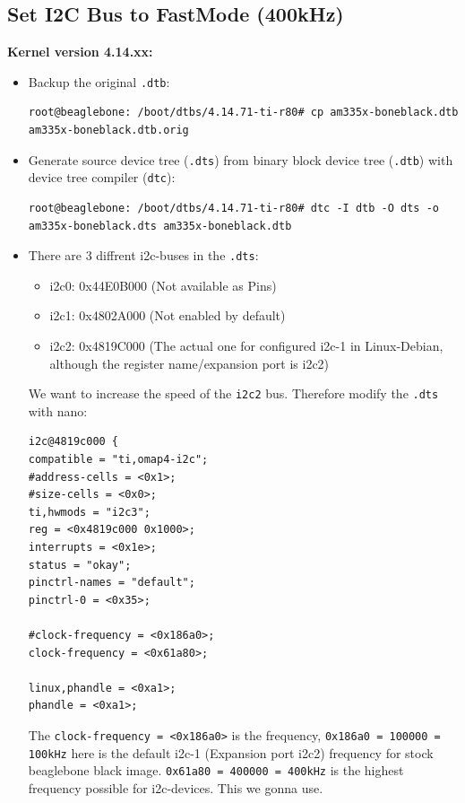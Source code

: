 \documentclass[
	fontsize=10pt
	paper=a4
]{scrartcl}
\begin{document}
\subsection{Set I2C Bus to FastMode (400kHz)}

\textbf{Kernel version 4.14.xx:}
\begin{itemize}
\item Backup the original \texttt{.dtb}:
\begin{lstlisting}
root@beaglebone: /boot/dtbs/4.14.71-ti-r80# cp am335x-boneblack.dtb am335x-boneblack.dtb.orig
\end{lstlisting}

\item Generate source device tree (\texttt{.dts}) from  binary block device tree (\texttt{.dtb}) with device tree compiler (\texttt{dtc}):
\begin{lstlisting}
root@beaglebone: /boot/dtbs/4.14.71-ti-r80# dtc -I dtb -O dts -o am335x-boneblack.dts am335x-boneblack.dtb
\end{lstlisting}

\item There are 3 diffrent i2c-buses in the \texttt{.dts}:
\begin{itemize}
	\item i2c0: 0x44E0B000 (Not available as Pins)
	\item i2c1: 0x4802A000 (Not enabled by default)
	\item i2c2: 0x4819C000 (The actual one for configured i2c-1 in Linux-Debian, although the register name/expansion port is i2c2)
\end{itemize}
We want to increase the speed of the \texttt{i2c2} bus. 
Therefore modify the \texttt{.dts} with nano:
\begin{lstlisting}
i2c@4819c000 {
compatible = "ti,omap4-i2c";
#address-cells = <0x1>;
#size-cells = <0x0>;
ti,hwmods = "i2c3";
reg = <0x4819c000 0x1000>;
interrupts = <0x1e>;
status = "okay";
pinctrl-names = "default";
pinctrl-0 = <0x35>;

#clock-frequency = <0x186a0>;
clock-frequency = <0x61a80>;

linux,phandle = <0xa1>;
phandle = <0xa1>;
\end{lstlisting}
The \texttt{clock-frequency = <0x186a0>} is the frequency, \texttt{0x186a0 = 100000 = 100kHz} here is the default i2c-1 (Expansion port i2c2) frequency for stock beaglebone black image.
\texttt{0x61a80 = 400000 = 400kHz} is the highest frequency possible for i2c-devices.
This we gonna use. 


\end{itemize}
\end{document}
